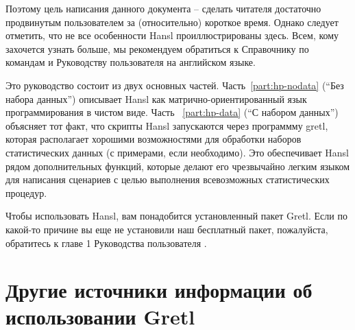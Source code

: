 \documentclass[oneside]{book}
\begin{document}
Поэтому цель написания данного документа – сделать читателя достаточно
продвинутым пользователем за (относительно) короткое время. Однако
следует отметить, что не все особенности Hansl проиллюстрированы
здесь. Всем, кому захочется узнать больше, мы рекомендуем обратиться к
Справочнику по командам \GCR{} и Руководству пользователя \GUG{} на
английском языке.

Это руководство состоит из двух основных
частей. Часть~\ref{part:hp-nodata} (``Без набора данных'') описывает
Hansl как матрично-ориентированный язык программирования в чистом
виде. Часть ~\ref{part:hp-data} (``С набором данных'') объясняет тот
факт, что скрипты Hansl запускаются через программму gretl, которая
располагает хорошими возможностями для обработки наборов
статистических данных (с примерами, если необходимо). Это обеспечивает
Hansl рядом дополнительных функций, которые делают его чрезвычайно
легким языком для написания сценариев с целью выполнения всевозможных
статистических процедур.


Чтобы использовать Hansl, вам понадобится установленный пакет
Gretl. Если по какой-то причине вы еще не установили наш бесплатный
пакет, пожалуйста, обратитесь к главе 1 Руководства пользователя \GUG.

\section*{Другие источники информации об использовании Gretl}
\end{document}
